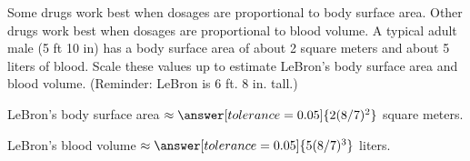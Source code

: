 \documentclass[nooutcomes]{ximera}
\begin{document}
\begin{problem}
Some drugs work best when dosages are proportional to body surface area.  Other drugs work best when dosages are proportional to blood volume.  A typical adult male (5 ft 10 in)  has a body surface area of about 2 square meters and about 5 liters of blood.  Scale these values up to estimate LeBron's body surface area and blood volume.  (Reminder:  LeBron is 6 ft. 8 in. tall.)

LeBron's body surface area $\approx \answer[tolerance=0.05]{2(8/7)^2}$ square meters. 

LeBron's blood volume $\approx \answer[tolerance=0.05]{5(8/7)^3}$ liters. 
\end{problem}

\end{document}
